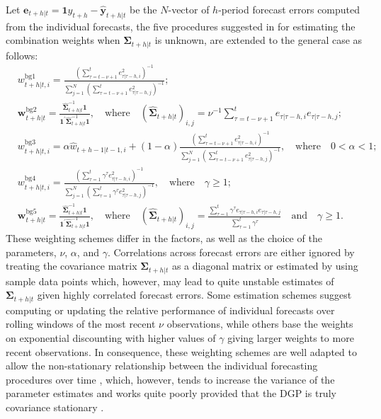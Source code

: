 \documentclass[11pt]{article}
\begin{document}
Let $\boldsymbol{e}_{t+h|t}=\boldsymbol{1} y_{t+h}-\hat{\boldsymbol{y}}_{t+h|t}$ be the $N$-vector of $h$-period forecast errors computed from the individual forecasts, the five procedures suggested in \citet{Bates1969-yj} for estimating the combination weights when $\boldsymbol{\Sigma}_{t+h|t}$ is unknown, are extended to the general case as follows:
\begin{align}
&w_{t+h|t, i}^{\text{bg1}}=\frac{\left( \sum_{\tau=t-\nu+1}^{t} e_{\tau|\tau-h, i}^{2} \right)^{-1}}{\sum_{j=1}^{N}\left(\sum_{\tau=t-\nu+1}^{t} e_{\tau|\tau-h, j}^{2}\right)^{-1}}; \label{eq:weight_bg1}\\
&\boldsymbol{w}_{t+h|t}^{\text{bg2}}=\frac{\hat{\boldsymbol{\Sigma}}_{t+h|t}^{-1}\boldsymbol{1}}{\boldsymbol{1}^{\prime} \hat{\boldsymbol{\Sigma}}_{t+h|t}^{-1} \boldsymbol{1}}, \quad \text{where} \quad (\hat{\boldsymbol{\Sigma}}_{t+h|t})_{i, j}=\nu^{-1} \sum_{\tau=t-\nu+1}^{t} e_{\tau|\tau-h, i} e_{\tau|\tau-h, j}; \nonumber\\
&w_{t+h|t, i}^{\text{bg3}}=\alpha \hat{w}_{t+h-1|t-1, i} + (1-\alpha) \frac{\left( \sum_{\tau=t-\nu+1}^{t} e_{\tau|\tau-h, i}^{2} \right)^{-1}}{\sum_{j=1}^{N}\left(\sum_{\tau=t-\nu+1}^{t} e_{\tau|\tau-h, j}^{2}\right)^{-1}}, \quad \text{where} \quad 0<\alpha<1; \nonumber\\
&w_{t+h|t, i}^{\text{bg4}}=\frac{\left( \sum_{\tau=1}^{t} \gamma^{\tau} e_{\tau|\tau-h, i}^{2} \right)^{-1}}{\sum_{j=1}^{N}\left(\sum_{\tau=1}^{t} \gamma^{\tau} e_{\tau|\tau-h, j}^{2}\right)^{-1}}, \quad \text{where} \quad \gamma \geq 1; \label{eq:weight_bg4}\\
&\boldsymbol{w}_{t+h|t}^{\text{bg5}}=\frac{\hat{\boldsymbol{\Sigma}}_{t+h|t}^{-1}\boldsymbol{1}}{\boldsymbol{1}^{\prime} \hat{\boldsymbol{\Sigma}}_{t+h|t}^{-1} \boldsymbol{1}}, \quad \text{where} \quad (\hat{\boldsymbol{\Sigma}}_{t+h|t})_{i, j}=\frac{\sum_{\tau=1}^{t} \gamma^{\tau} e_{\tau|\tau-h, i} e_{\tau|\tau-h, j}}{\sum_{\tau=1}^{t} \gamma^{\tau}} \quad \text{and} \quad \gamma \geq 1. \nonumber
\end{align}
These weighting schemes differ in the factors, as well as the choice of the parameters, $\nu$, $\alpha$, and $\gamma$. Correlations across forecast errors are either ignored by treating the covariance matrix $\boldsymbol{\Sigma}_{t+h|t}$ as a diagonal matrix or estimated by using sample data points which, however, may lead to quite unstable estimates of $\boldsymbol{\Sigma}_{t+h|t}$ given highly correlated forecast errors. Some estimation schemes suggest computing or updating the relative performance of individual forecasts over rolling windows of the most recent $\nu$ observations, while others base the weights on exponential discounting with higher values of $\gamma$ giving larger weights to more recent observations. In consequence, these weighting schemes are well adapted to allow the non-stationary relationship between the individual forecasting procedures over time \citep{Newbold1974-lp}, which, however, tends to increase the variance of the parameter estimates and works quite poorly provided that the DGP is truly covariance stationary \citep{Timmermann2006-en}.
\end{document}

